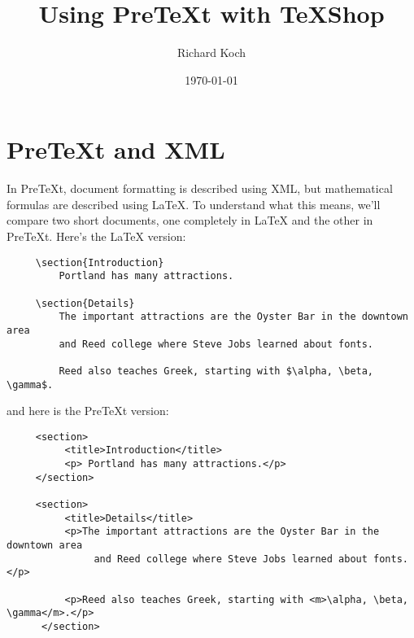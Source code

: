 \documentclass[11pt, oneside]{article}   	%
\title{Using PreTeXt with TeXShop}
\author{Richard Koch}
\date{\today}							%
\begin{document}
\maketitle
\section{PreTeXt and XML}

In PreTeXt,  document formatting is described using XML, but mathematical formulas are described using LaTeX. To understand what this means, we'll compare two short documents, one completely in LaTeX and the other in PreTeXt. Here's the LaTeX version:
\begin{verbatim}
     \section{Introduction}
         Portland has many attractions.

     \section{Details}
         The important attractions are the Oyster Bar in the downtown area 
         and Reed college where Steve Jobs learned about fonts. 

         Reed also teaches Greek, starting with $\alpha, \beta, \gamma$.
\end{verbatim}
 \vspace{.1in}
 and here is the PreTeXt version:
 \vspace{.1in}
 \begin{verbatim}
     <section>
          <title>Introduction</title>
          <p> Portland has many attractions.</p>
     </section>
      
     <section>
          <title>Details</title>
          <p>The important attractions are the Oyster Bar in the downtown area 
               and Reed college where Steve Jobs learned about fonts. </p>
     
          <p>Reed also teaches Greek, starting with <m>\alpha, \beta, \gamma</m>.</p>
      </section>
\end{verbatim}
\end{document}
